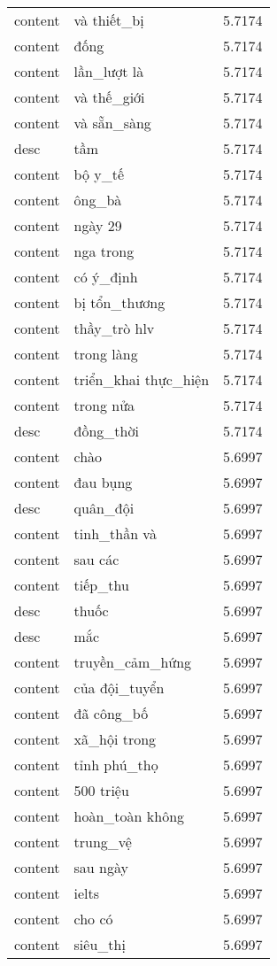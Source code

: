\documentclass{article}
\begin{document}
\begin{tabular}{lll}
content & và thiết\_bị & 5.7174\\
content & đống & 5.7174\\
content & lần\_lượt là & 5.7174\\
content & và thế\_giới & 5.7174\\
content & và sẵn\_sàng & 5.7174\\
desc & tầm & 5.7174\\
content & bộ y\_tế & 5.7174\\
content & ông\_bà & 5.7174\\
content & ngày 29 & 5.7174\\
content & nga trong & 5.7174\\
content & có ý\_định & 5.7174\\
content & bị tổn\_thương & 5.7174\\
content & thầy\_trò hlv & 5.7174\\
content & trong làng & 5.7174\\
content & triển\_khai thực\_hiện & 5.7174\\
content & trong nửa & 5.7174\\
desc & đồng\_thời & 5.7174\\
content & chào & 5.6997\\
content & đau bụng & 5.6997\\
desc & quân\_đội & 5.6997\\
content & tinh\_thần và & 5.6997\\
content & sau các & 5.6997\\
content & tiếp\_thu & 5.6997\\
desc & thuốc & 5.6997\\
desc & mắc & 5.6997\\
content & truyền\_cảm\_hứng & 5.6997\\
content & của đội\_tuyển & 5.6997\\
content & đã công\_bố & 5.6997\\
content & xã\_hội trong & 5.6997\\
content & tỉnh phú\_thọ & 5.6997\\
content & 500 triệu & 5.6997\\
content & hoàn\_toàn không & 5.6997\\
content & trung\_vệ & 5.6997\\
content & sau ngày & 5.6997\\
content & ielts & 5.6997\\
content & cho có & 5.6997\\
content & siêu\_thị & 5.6997\\

\end{tabular}
\end{document}
